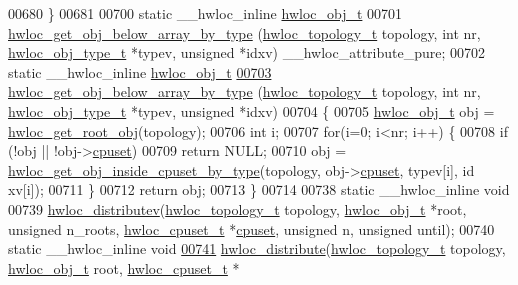 \begin{DoxyCode}
00680 \}
00681 
00700 \textcolor{keyword}{static} \_\_hwloc\_inline \hyperlink{a00016}{hwloc_obj_t}
00701 \hyperlink{a00058_gac33a0990f4e771b2117ddedabc3f00f6}{hwloc_get_obj_below_array_by_type} (\hyperlink{a00039_ga9d1e76ee15a7dee158b786c30b6a6e38}{hwloc_topology_t} topology, \textcolor{keywordtype}{int} nr, 
      \hyperlink{a00041_gacd37bb612667dc437d66bfb175a8dc55}{hwloc_obj_type_t} *typev, \textcolor{keywordtype}{unsigned} *idxv) \_\_hwloc\_attribute\_pure;
00702 \textcolor{keyword}{static} \_\_hwloc\_inline \hyperlink{a00016}{hwloc_obj_t}
\hypertarget{a00031_source_l00703}{}\hyperlink{a00058_gac33a0990f4e771b2117ddedabc3f00f6}{00703} \hyperlink{a00058_gac33a0990f4e771b2117ddedabc3f00f6}{hwloc_get_obj_below_array_by_type} (\hyperlink{a00039_ga9d1e76ee15a7dee158b786c30b6a6e38}{hwloc_topology_t} topology, \textcolor{keywordtype}{int} nr, 
      \hyperlink{a00041_gacd37bb612667dc437d66bfb175a8dc55}{hwloc_obj_type_t} *typev, \textcolor{keywordtype}{unsigned} *idxv)
00704 \{
00705   \hyperlink{a00016}{hwloc_obj_t} obj = \hyperlink{a00053_gadbf58f6e187efbdb3cd9a8e30311b7d7}{hwloc_get_root_obj}(topology);
00706   \textcolor{keywordtype}{int} i;
00707   \textcolor{keywordflow}{for}(i=0; i<nr; i++) \{
00708     \textcolor{keywordflow}{if} (!obj || !obj->\hyperlink{a00016_a67925e0f2c47f50408fbdb9bddd0790f}{cpuset})
00709       \textcolor{keywordflow}{return} NULL;
00710     obj = \hyperlink{a00054_gaa8dcdb85224f7350b90fb0a1ca91e6d6}{hwloc_get_obj_inside_cpuset_by_type}(topology, obj->\hyperlink{a00016_a67925e0f2c47f50408fbdb9bddd0790f}{cpuset}, typev[i], id
      xv[i]);
00711   \}
00712   \textcolor{keywordflow}{return} obj;
00713 \}
00714 
00738 \textcolor{keyword}{static} \_\_hwloc\_inline \textcolor{keywordtype}{void}
00739 \hyperlink{a00059_gaf057d7c5e3cb3df897ce527258537619}{hwloc_distributev}(\hyperlink{a00039_ga9d1e76ee15a7dee158b786c30b6a6e38}{hwloc_topology_t} topology, \hyperlink{a00016}{hwloc_obj_t} *root, \textcolor{keywordtype}{unsigned} n\_roots,
       \hyperlink{a00040_ga4bbf39b68b6f568fb92739e7c0ea7801}{hwloc_cpuset_t} *\hyperlink{a00016_a67925e0f2c47f50408fbdb9bddd0790f}{cpuset}, \textcolor{keywordtype}{unsigned} n, \textcolor{keywordtype}{unsigned} until);
00740 \textcolor{keyword}{static} \_\_hwloc\_inline \textcolor{keywordtype}{void}
\hypertarget{a00031_source_l00741}{}\hyperlink{a00059_ga6d5c88292ad5aa062c1bebc99369c042}{00741} \hyperlink{a00059_ga6d5c88292ad5aa062c1bebc99369c042}{hwloc_distribute}(\hyperlink{a00039_ga9d1e76ee15a7dee158b786c30b6a6e38}{hwloc_topology_t} topology, \hyperlink{a00016}{hwloc_obj_t} root, \hyperlink{a00040_ga4bbf39b68b6f568fb92739e7c0ea7801}{hwloc_cpuset_t} *

\end{DoxyCode}
